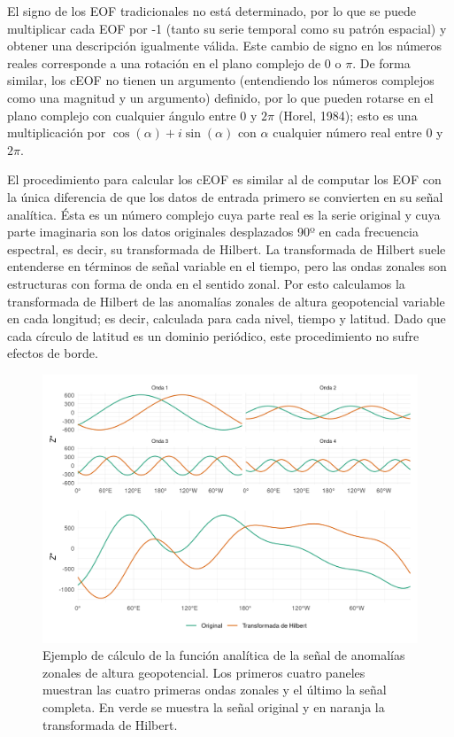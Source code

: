 \documentclass[12pt,oneside]{reedthesis}
\begin{document}
El signo de los EOF tradicionales no está determinado, por lo que se puede multiplicar cada EOF por -1 (tanto su serie temporal como su patrón espacial) y obtener una descripción igualmente válida.
Este cambio de signo en los números reales corresponde a una rotación en el plano complejo de 0 o \(\pi\).
De forma similar, los cEOF no tienen un argumento (entendiendo los números complejos como una magnitud y un argumento) definido, por lo que pueden rotarse en el plano complejo con cualquier ángulo entre 0 y \(2\pi\) (Horel, 1984); esto es una multiplicación por \(\cos(\alpha) + i\sin(\alpha)\) con \(\alpha\) cualquier número real entre 0 y \(2\pi\).

El procedimiento para calcular los cEOF es similar al de computar los EOF con la única diferencia de que los datos de entrada primero se convierten en su señal analítica.
Ésta es un número complejo cuya parte real es la serie original y cuya parte imaginaria son los datos originales desplazados 90º en cada frecuencia espectral, es decir, su transformada de Hilbert.
La transformada de Hilbert suele entenderse en términos de señal variable en el tiempo, pero las ondas zonales son estructuras con forma de onda en el sentido zonal.
Por esto calculamos la transformada de Hilbert de las anomalías zonales de altura geopotencial variable en cada longitud; es decir, calculada para cada nivel, tiempo y latitud.
Dado que cada círculo de latitud es un dominio periódico, este procedimiento no sufre efectos de borde.





\begin{figure}
\includegraphics{figures/20-ceofs/hilbert-ejemplo-1} \caption{Ejemplo de cálculo de la función analítica de la señal de anomalías zonales de altura geopotencial.
Los primeros cuatro paneles muestran las cuatro primeras ondas zonales y el último la señal completa.
En verde se muestra la señal original y en naranja la transformada de Hilbert.}\label{fig:hilbert-ejemplo}
\end{figure}
\end{document}
